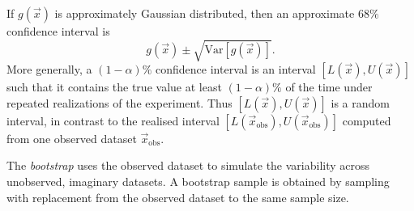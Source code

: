 \documentclass[11pt, titlepage]{article} %
\numberwithin{equation}{section}
\theoremstyle{definition}
\numberwithin{assumption}{section}
\begin{document}
If $g(\vec x)$ is approximately Gaussian distributed, then an approximate $68\%$ confidence interval is
\begin{equation*}
    g(\vec x)\pm \sqrt{\mathrm{Var}[g(\vec x)]}.
\end{equation*}
More generally, a $(1-\alpha)\%$ confidence interval is an interval $[L(\vec x),U(\vec x)]$ such that it contains the true value at least $(1-\alpha)\%$ of the time under repeated realizations of the experiment. Thus $[L(\vec x),U(\vec x)]$ is a random interval, in contrast to the realised interval $[L(\vec x_{\mathrm{obs}}),U(\vec x_{\mathrm{obs}})]$ computed from one observed dataset $\vec x_{\mathrm{obs}}$.

The \textit{bootstrap} uses the observed dataset to simulate the variability across unobserved, imaginary datasets. A bootstrap sample is obtained by sampling with replacement from the observed dataset to the same sample size.
\end{document}
